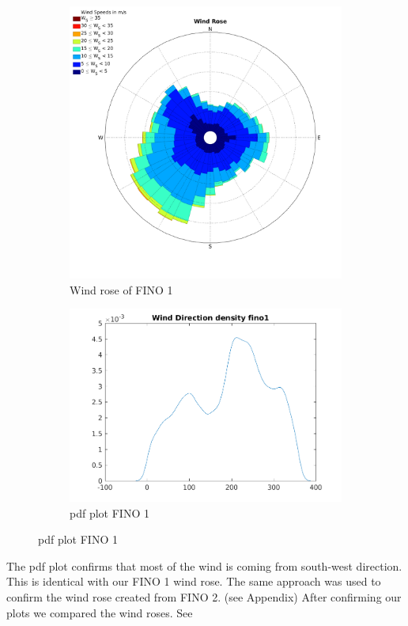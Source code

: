 \documentclass[10pt]{article}
\begin{document}
\begin{figure}[htb!]
\label{fig:WindRose1_valdidation}
\begin{subfigure}{0.5\textwidth}
  \centering
  \includegraphics[width=1\linewidth]{../figures/WindRose_Fino1.png}
  \caption{Wind rose of FINO 1}
  \label{fig:Windrose_Fino1}
\end{subfigure}
\begin{subfigure}{0.5\textwidth}
  \centering
  \includegraphics[width=1\linewidth]{../figures/Validation_WindRose_Fino1.png}
  \caption{pdf plot FINO 1}
    \label{fig:Windrose_Fino2}
\end{subfigure}
\end{figure}
\newpage
The pdf plot confirms that most of the wind is coming from south-west direction. This is identical with our FINO 1 wind rose. The same approach was used to confirm the wind rose created from FINO 2. (see Appendix)
After confirming our plots we compared the wind roses. See 
\end{document}
